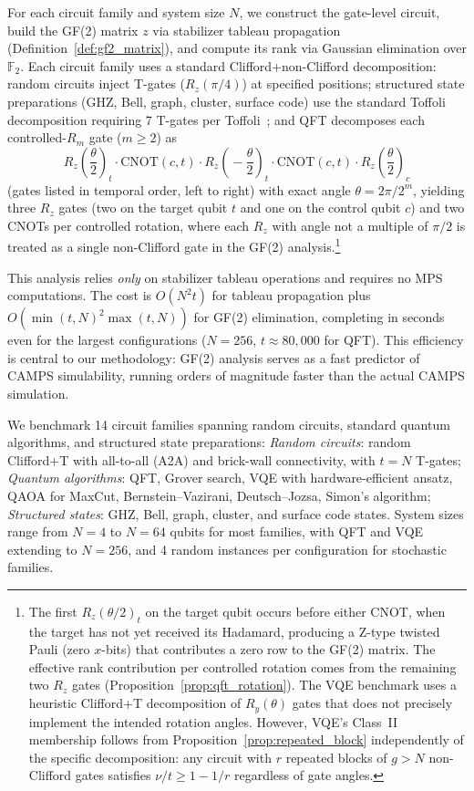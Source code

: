 \documentclass[a4paper,twocolumn,11pt]{quantumarticle}
\begin{document}
For each circuit family and system size $N$, we construct the gate-level circuit, build the GF(2) matrix $z$ via stabilizer tableau propagation (Definition~\ref{def:gf2_matrix}), and compute its rank via Gaussian elimination over $\mathbb{F}_2$.
Each circuit family uses a standard Clifford+non-Clifford decomposition: random circuits inject T-gates ($R_z(\pi/4)$) at specified positions; structured state preparations (GHZ, Bell, graph, cluster, surface code) use the standard Toffoli decomposition requiring 7 T-gates per Toffoli~\cite{Selinger2013}; and QFT decomposes each controlled-$R_m$ gate ($m \ge 2$) as
\begin{equation}
\label{eq:cr_decomp}
R_z\!\left(\frac{\theta}{2}\right)_t \cdot \mathrm{CNOT}(c,t) \cdot R_z\!\left(\!-\frac{\theta}{2}\right)_t \cdot \mathrm{CNOT}(c,t) \cdot R_z\!\left(\frac{\theta}{2}\right)_c
\end{equation}
(gates listed in temporal order, left to right) with exact angle $\theta = 2\pi/2^m$, yielding three $R_z$ gates (two on the target qubit $t$ and one on the control qubit $c$) and two CNOTs per controlled rotation, where each $R_z$ with angle not a multiple of $\pi/2$ is treated as a single non-Clifford gate in the GF(2) analysis.\footnote{The first $R_z(\theta/2)_t$ on the target qubit occurs before either CNOT, when the target has not yet received its Hadamard, producing a Z-type twisted Pauli (zero $x$-bits) that contributes a zero row to the GF(2) matrix. The effective rank contribution per controlled rotation comes from the remaining two $R_z$ gates (Proposition~\ref{prop:qft_rotation}). The VQE benchmark uses a heuristic Clifford+T decomposition of $R_y(\theta)$ gates that does not precisely implement the intended rotation angles. However, VQE's Class~II membership follows from Proposition~\ref{prop:repeated_block} independently of the specific decomposition: any circuit with $r$ repeated blocks of $g > N$ non-Clifford gates satisfies $\nu/t \ge 1 - 1/r$ regardless of gate angles.}

This analysis relies \emph{only} on stabilizer tableau operations and requires no MPS computations.
The cost is $O(N^2 t)$ for tableau propagation plus $O(\min(t,N)^2 \max(t,N))$ for GF(2) elimination, completing in seconds even for the largest configurations ($N = 256$, $t \approx 80{,}000$ for QFT).
This efficiency is central to our methodology: GF(2) analysis serves as a fast predictor of CAMPS simulability, running orders of magnitude faster than the actual CAMPS simulation.

We benchmark 14 circuit families spanning random circuits, standard quantum algorithms, and structured state preparations:
\emph{Random circuits}: random Clifford+T with all-to-all (A2A) and brick-wall connectivity, with $t = N$ T-gates;
\emph{Quantum algorithms}: QFT, Grover search, VQE with hardware-efficient ansatz, QAOA for MaxCut, Bernstein--Vazirani, Deutsch--Jozsa, Simon's algorithm;
\emph{Structured states}: GHZ, Bell, graph, cluster, and surface code states.
System sizes range from $N = 4$ to $N = 64$ qubits for most families, with QFT and VQE extending to $N = 256$, and 4 random instances per configuration for stochastic families.
\end{document}
